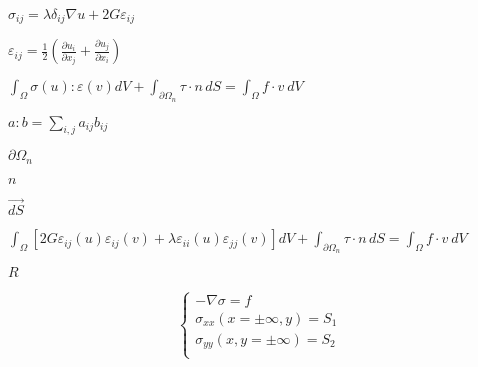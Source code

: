 \documentclass[onecolumn,11pt]{report}
\def\lthtmlcheckvsize{\ifdim\ht\sizebox<\vsize 
  \ifdim\wd\sizebox<\hsize\expandafter\hfill\fi \expandafter\vfill
  \else\expandafter\vss\fi}%
\begin{document}
{\newpage\clearpage
{}%
$\displaystyle \sigma_{ij} = \lambda \delta_{ij}\nabla u + 2G\varepsilon_{ij}$%
\lthtmlindisplaymathZ
\lthtmlcheckvsize\clearpage}

{\newpage\clearpage
{}%
$\displaystyle \varepsilon_{ij} = \frac{1}{2}\left(
\frac{\partial u_i}{\partial x_j} +
\frac{\partial u_j}{\partial x_i}
\right)$%
\lthtmlindisplaymathZ
\lthtmlcheckvsize\clearpage}

{\newpage\clearpage
{}%
$\displaystyle \int_{\Omega}\sigma(u):\varepsilon(v) dV
+ \int_{\partial \Omega_n}\tau \cdot n \, dS
= \int_{\Omega}{f \cdot v \  dV}$%
\lthtmlindisplaymathZ
\lthtmlcheckvsize\clearpage}

{\newpage\clearpage
{}%
$ a : b = \sum_{i, j} a_{ij}b_{ij}$%
\lthtmlindisplaymathZ
\lthtmlcheckvsize\clearpage}

{\newpage\clearpage
{}%
$ \partial \Omega_n$%
\lthtmlindisplaymathZ
\lthtmlcheckvsize\clearpage}

{\newpage\clearpage
{}%
$ n$%
\lthtmlindisplaymathZ
\lthtmlcheckvsize\clearpage}

{\newpage\clearpage
{}%
$ \vec{dS}$%
\lthtmlindisplaymathZ
\lthtmlcheckvsize\clearpage}

{\newpage\clearpage
{}%
$\displaystyle \int_{\Omega} \left[
2G\varepsilon_{ij}(u)\varepsilon_{ij}(v) +
\lambda \varepsilon_{ii}(u)\varepsilon_{jj}(v)
\right] dV
+ \int_{\partial \Omega_n}\tau \cdot n \, dS
= \int_{\Omega}f\cdot v \  dV$%
\lthtmlindisplaymathZ
\lthtmlcheckvsize\clearpage}

{\newpage\clearpage
{}%
$ R$%
\lthtmlindisplaymathZ
\lthtmlcheckvsize\clearpage}

{\newpage\clearpage
{}%
\begin{displaymath}\begin{cases}
-\nabla \sigma = f \\
\sigma_{xx}(x=\pm\infty, y) = S_1 \\
\sigma_{yy}(x, y=\pm\infty) = S_2 \\
\end{cases}\end{displaymath}%
\lthtmldisplayZ
\lthtmlcheckvsize\clearpage}
\end{document}
